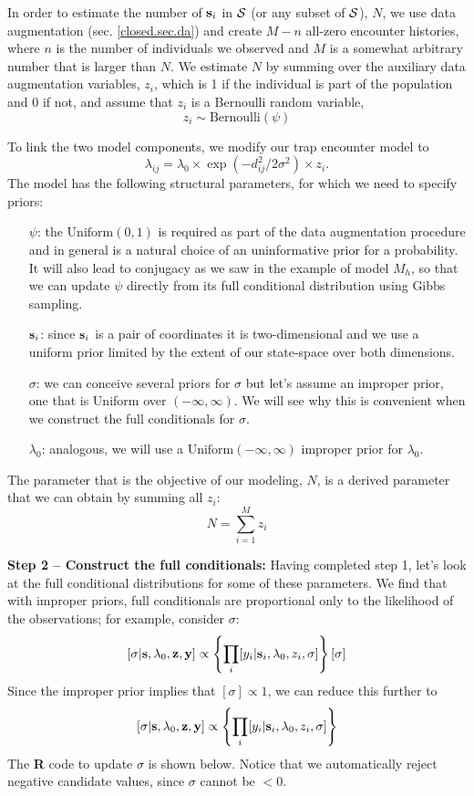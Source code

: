 In order to estimate the number of ${\bf s}_i$ in ${\cal S}$ (or any
subset of ${\cal S}$), $N$, we use data augmentation (sec. \ref{closed.sec.da}) and create $M-n$ all-zero encounter histories, where $n$ is the number of individuals we observed and $M$ is a somewhat arbitrary number that is larger than $N$. We estimate $N$ by summing over the auxiliary data augmentation variables, $z_i$, which is 1 if the individual is part of the population and 0 if not, and assume that $z_i$ is a Bernoulli random variable,
\[
z_{i} \sim \mbox{Bernoulli}(\psi)
\]

To link the two model components, we modify our trap encounter model to
\[
\lambda_{ij} = \lambda_0 \times \exp(-d_{ij}^2/2\sigma^2) \times z_{i}.
\]
The model has the following structural parameters, for which we need to specify priors:
\begin{itemize}
\item[ $\psi$:] the $\mbox{Uniform}(0,1)$ is required as part of the data augmentation procedure and in general is a natural choice of an uninformative prior for a probability. It will also lead to conjugacy as we saw in the example of model $M_h$, so that we can update $\psi$ directly from its full conditional distribution using Gibbs sampling.
\item[ ${\bf s}_{i}$:] since ${\bf s}_{i}$ is a pair of coordinates it is two-dimensional and we use a uniform prior limited by the extent of our state-space over both dimensions.
\item[ $\sigma$:] we can conceive several priors for $\sigma$ but let's assume an improper prior, one that is Uniform over $(-\infty, \infty)$. We will see why this is convenient when we construct the full conditionals for $\sigma$.
\item[ $\lambda_{0}$:] analogous, we will use a $\mbox{Uniform}(-\infty, \infty)$ improper prior for $\lambda_{0}$.
\end{itemize}
The parameter that is the objective of our modeling, $N$, is a derived parameter that we can obtain by summing all $z_i$:
\[
N = \sum_{i=1}^{M} z_{i}
\]

{\bf Step 2 -- Construct the full conditionals:}
Having completed step 1, let's look at the full conditional distributions for some of these parameters.
We find that with improper priors, full conditionals are proportional only to the likelihood of the observations; for example, consider $\sigma$:
\[
[\sigma|{\bf s}, \lambda_{0}, {\bf z}, {\bf y}] \propto \left\{ \prod_{i} [y_{i}| {\bf
    s}_{i}, \lambda_{0}, z_{i}, \sigma] \right\}  [\sigma]
\]
Since the improper prior implies that $[\sigma] \propto 1$, we can reduce this further to
\[
[\sigma|{\bf s}, \lambda_{0}, {\bf z}, {\bf y}] \propto \left\{
  \prod_{i} [y_{i}| {\bf s}_{i}, \lambda_{0}, z_{i}, \sigma] \right\}
\]
The {\bf R} code to update $\sigma$ is shown below.
Notice that we automatically reject negative candidate values, since $\sigma$ cannot be $<0$.


